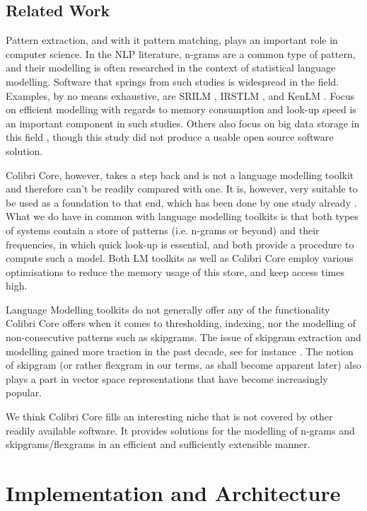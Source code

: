 \subsection*{Related Work}

Pattern extraction, and with it pattern matching, plays an important role in
computer science. In the NLP literature, n-grams are a common type of pattern,
and their modelling is often researched in the context of statistical language
modelling.  Software that springs from such studies is widespread in the field.
Examples, by no means exhaustive, are SRILM \cite{SRILM}, IRSTLM \cite{IRSTLM},
and KenLM \cite{KENLM}. Focus on efficient modelling with regards to memory
consumption and look-up speed is an important component in such studies.
Others also focus on big data storage in this field \cite{Guthrie2010}, though
this study did not produce a usable open source software solution.

Colibri Core, however, takes a step back and is not a language modelling
toolkit and therefore can't be readily compared with one. It is, however, very
suitable to be used as a foundation to that end, which has been done by
one study already \cite{COCOCPYP}. What we do have in common with language modelling toolkits is
that both types of systems contain a store of patterns (i.e. n-grams or beyond)
and their frequencies, in which quick look-up is essential, and both provide a
procedure to compute such a model. Both LM toolkits as well as Colibri Core
employ various optimisations to reduce the memory usage of this store, and keep
access times high.

Language Modelling toolkits do not generally offer any of the functionality
Colibri Core offers when it comes to thresholding, indexing, nor the modelling of
non-consecutive patterns such as skipgrams. The issue of skipgram extraction
and modelling gained more traction in the past decade, see for instance
\cite{Guthrie06}. The notion of skipgram (or rather flexgram in our terms, as
shall become apparent later) also plays a part in vector space representations
\cite{Mikolov08} that have become increasingly popular.

We think Colibri Core fills an interesting niche that is not covered by other
readily available software. It provides solutions for the modelling of n-grams and
skipgrams/flexgrams in an efficient and sufficiently extensible manner.

\section{Implementation and Architecture}

